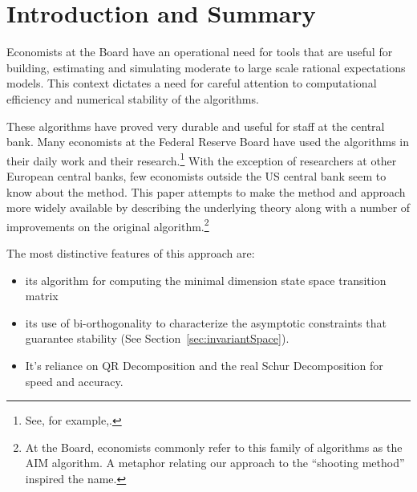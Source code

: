 \documentclass{elsart}
\begin{document}




\section{Introduction and Summary}
\label{sec:intro}
\nocite{anderson06}


Economists at the Board have an operational need for tools
that are useful for building, estimating and simulating moderate to large
scale rational 
expectations models.
This context dictates a need for careful 
attention to computational efficiency and
numerical stability of the algorithms.


These algorithms have proved very durable and 
useful for staff at the central bank.
Many economists at the Federal Reserve Board 
have used the algorithms in their daily 
work and their research.\footnote{
See, 
for example,\cite{bomfim96,persist,realrate,stab,zerobnd,fwlb,optpol,longrate,gmmml,learn,optsac,cr96,orphanides97,andrew98,orphanides98,orphanides98a,edge03,orphanides02}.}
With the exception of researchers at other European
central banks\cite{zagaglia02},
 few  economists outside the US central bank seem to know about the 
method.
This paper attempts to make the method and approach more widely 
available by describing the underlying theory along with a number of
improvements on the original algorithm.\footnote{ At the Board, economists commonly refer to this family of
algorithms as the 
AIM algorithm. A metaphor relating our approach to the ``shooting method'' 
inspired the name. }

The most distinctive features of this approach are:
\begin{itemize}
\item its algorithm for computing the minimal dimension state space 
transition matrix 
\item its
use of bi-orthogonality to characterize the asymptotic constraints 
that guarantee stability (See Section~\ref{sec:invariantSpace}).
\item It's reliance on QR Decomposition and the real Schur Decomposition
for speed and accuracy.
\end{itemize}
\end{document}
